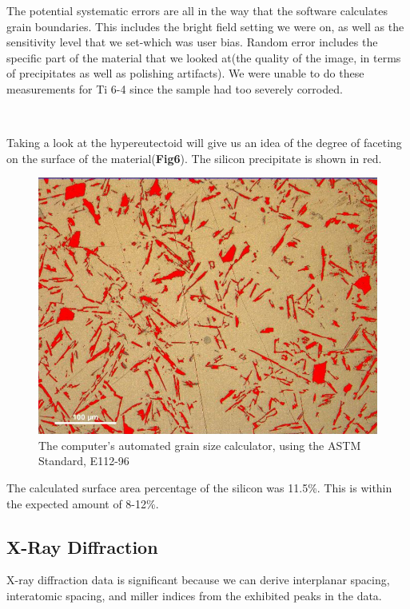 \documentclass{article}
\begin{document}
The potential systematic errors are all in the way that the software calculates grain boundaries. This includes the bright field setting we were on, as well as the sensitivity level that we set-which was user bias. Random error includes the specific part of the material that we looked at(the quality of the image, in terms of precipitates as well as polishing artifacts). We were unable to do these measurements for Ti 6-4 since the sample had too severely corroded.

\ 

Taking a look at the hypereutectoid will give us an idea of the degree of faceting on the surface of the material(\textbf{Fig6}). The silicon precipitate is shown in red.

\begin{figure}[h]
	\centering
	\includegraphics[scale=.6]{hyperu.png}
	\caption{The computer's automated grain size calculator, using the ASTM Standard, E112-96}
\end{figure}

The calculated surface area percentage of the silicon was 11.5\%. This is within the expected amount of 8-12\%.

\subsection{X-Ray Diffraction}

X-ray diffraction data is significant because we can derive interplanar spacing, interatomic spacing, and miller indices from the exhibited peaks in the data.
\end{document}
